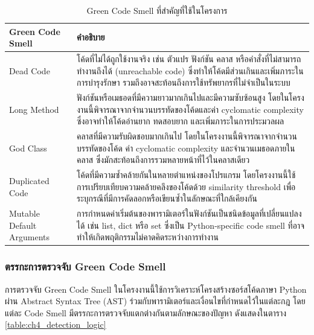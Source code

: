 \begin{table}[H]
    \centering
    \renewcommand{\arraystretch}{1.25}
    \setlength{\tabcolsep}{6pt}
    \begin{tabularx}{\textwidth}{|P{3.5cm}|X|}
        \hline
        {\boldfont Green Code Smell} & {\boldfont คำอธิบาย} \\
        \hline
        Dead Code & โค้ดที่ไม่ได้ถูกใช้งานจริง เช่น ตัวแปร ฟังก์ชัน คลาส หรือคำสั่งที่ไม่สามารถทำงานถึงได้ ({\italicfont unreachable code}) ซึ่งทำให้โค้ดมีส่วนเกินและเพิ่มภาระในการบำรุงรักษา รวมถึงอาจสะท้อนถึงการใช้ทรัพยากรที่ไม่จำเป็นในระบบ \cite{pylintUnreachable,pylintPossiblyUnusedVariable,vultureDeadCode,refactoringGuruDeadCode} \\
        \hline
        Long Method & ฟังก์ชันหรือเมธอดที่มีความยาวมากเกินไปและมีความซับซ้อนสูง โดยในโครงงานนี้พิจารณาจากจำนวนบรรทัดของโค้ดและค่า {\italicfont cyclomatic complexity} ซึ่งอาจทำให้โค้ดอ่านยาก ทดสอบยาก และเพิ่มภาระในการประมวลผล \cite{refactoringGuruLongMethod,guru99CyclomaticComplexity} \\
        \hline
        God Class & คลาสที่มีความรับผิดชอบมากเกินไป โดยในโครงงานนี้พิจารณาจากจำนวนบรรทัดของโค้ด ค่า {\italicfont cyclomatic complexity} และจำนวนเมธอดภายในคลาส ซึ่งมักสะท้อนถึงการรวมหลายหน้าที่ไว้ในคลาสเดียว \cite{refactoringGuruLargeClass,radonCyclomaticComplexity} \\
        \hline
        Duplicated Code & โค้ดที่มีความซ้ำคล้ายกันในหลายตำแหน่งของโปรแกรม โดยโครงงานนี้ใช้การเปรียบเทียบความคล้ายคลึงของโค้ดด้วย {\italicfont similarity threshold} เพื่อระบุกรณีที่มีการคัดลอกหรือเขียนซ้ำในลักษณะที่ใกล้เคียงกัน \cite{pythonDifflib,pylintDuplicateCode,refactoringGuruDuplicateCode} \\
        \hline
        Mutable Default Arguments & การกำหนดค่าเริ่มต้นของพารามิเตอร์ในฟังก์ชันเป็นชนิดข้อมูลที่เปลี่ยนแปลงได้ เช่น {\italicfont list}, {\italicfont dict} หรือ {\italicfont set} ซึ่งเป็น {\italicfont Python-specific code smell} ที่อาจทำให้เกิดพฤติกรรมไม่คาดคิดระหว่างการทำงาน \cite{pylintDangerousDefaultValue,sonarMutableDefaultArgument} \\
        \hline
    \end{tabularx}
\captionsetup{justification=centering, name=ตาราง}
\caption{Green Code Smell ที่สำคัญที่ใช้ในโครงการ}
\label{table:ch4_green_code_smells}
\end{table}

\subsubsection{ตรรกะการตรวจจับ Green Code Smell}
การตรวจจับ Green Code Smell ในโครงงานนี้ใช้การวิเคราะห์โครงสร้างซอร์สโค้ดภาษา Python ผ่าน Abstract Syntax Tree (AST) ร่วมกับพารามิเตอร์และเงื่อนไขที่กำหนดไว้ในแต่ละกฎ โดยแต่ละ Code Smell มีตรรกะการตรวจจับแตกต่างกันตามลักษณะของปัญหา ดังแสดงในตาราง \ref{table:ch4_detection_logic}

